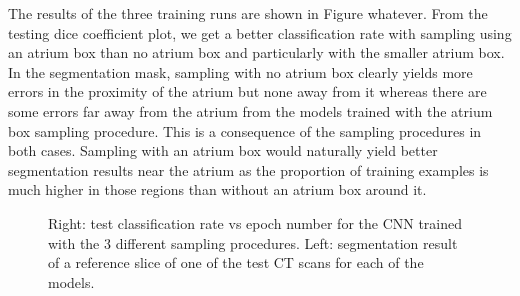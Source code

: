 The results of the three training runs are shown in Figure whatever. From the testing dice coefficient plot, we get a better classification rate with sampling using an atrium box than no atrium box and particularly with the smaller atrium box. In the segmentation mask, sampling with no atrium box clearly yields more errors in the proximity of the atrium but none away from it whereas there are some errors far away from the atrium from the models trained with the atrium box sampling procedure. This is a consequence of the sampling procedures in both cases. Sampling with an atrium box would naturally yield better segmentation results near the atrium as the proportion of training examples is much higher in those regions than without an atrium box around it.\\

\begin{figure}
\centering
\begin{minipage}{0.45\textwidth}
\centering
{}
\end{minipage}\hfill
\hspace{-1cm}
\begin{minipage}{0.45\textwidth}
\centering
{}
\end{minipage}
\caption{Right: test classification rate vs epoch number for the CNN trained with the 3 different sampling procedures. Left: segmentation result of a reference slice of one of the test CT scans for each of the models.}
\end{figure}

